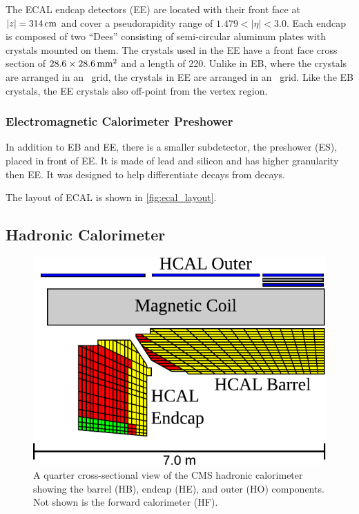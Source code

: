 The ECAL endcap detectors (EE) are located with their front face at
$|z|=314\text{\,cm}$ and cover a pseudorapidity range of $1.479 < |\eta| <
3.0$. Each endcap is composed of two ``Dees'' consisting of semi-circular
aluminum plates with crystals mounted on them. The crystals used in the EE have
a front face cross section of $28.6 \times 28.6\text{\,mm}^{2}$ and a length
of 220\millimeters. Unlike in EB, where the crystals are arranged in an
\coordetaphi~grid, the crystals in EE are arranged in an \coordxy~grid. Like
the EB crystals, the EE crystals also off-point from the vertex region.

\subsubsection{Electromagnetic Calorimeter Preshower}

In addition to EB and EE, there is a smaller subdetector, the preshower (ES),
placed in front of EE. It is made of lead and silicon and has higher
granularity then EE. It was designed to help differentiate \pitogammagamma
decays from \higgstogammagamma decays.

The layout of ECAL is shown in \cref{fig:ecal_layout}.

\subsection{Hadronic Calorimeter}
\label{ssec:hcal}

\begin{figure}[!htbp]
    \centering
    \includegraphics[width=\textwidth]{figures/hcal_cross_section.pdf}
    \caption[
        A quarter cross-sectional view of the CMS hadronic calorimeter.
    ]{
        A quarter cross-sectional view of the CMS hadronic calorimeter showing
        the barrel (HB), endcap (HE), and outer (HO) components. Not shown is
        the forward calorimeter (HF).
    }
    \label{fig:hcal_layout}
\end{figure}

